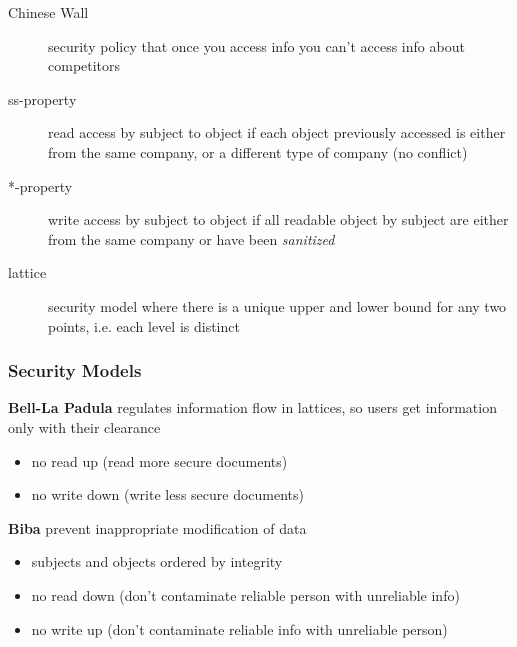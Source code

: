 \documentclass[]{article}
\theoremstyle{definition}
\begin{document}
	\begin{description}
		\item[Chinese Wall] security policy that once you access info you can't access info about competitors
		\item[ss-property] read access by subject to object if each object previously accessed is either from the same company, or a different type of company (no conflict)
		\item[*-property] write access by subject to object if all readable object by subject are either from the same company or have been \textit{sanitized} 
		\item[lattice] security model where there is a unique upper and lower bound for any two points, i.e. each level is distinct
	\end{description}

	\subsubsection{Security Models}
	\textbf{Bell-La Padula} regulates information flow in lattices, so users get information only with their clearance
	\begin{itemize}
		\item no read up (read more secure documents)
		\item no write down (write less secure documents)
	\end{itemize}
	\textbf{Biba} prevent inappropriate modification of data
	\begin{itemize}
		\item subjects and objects ordered by integrity
		\item no read down (don't contaminate reliable person with unreliable info)
		\item no write up (don't contaminate reliable info with unreliable person)
	\end{itemize}
\end{document}
